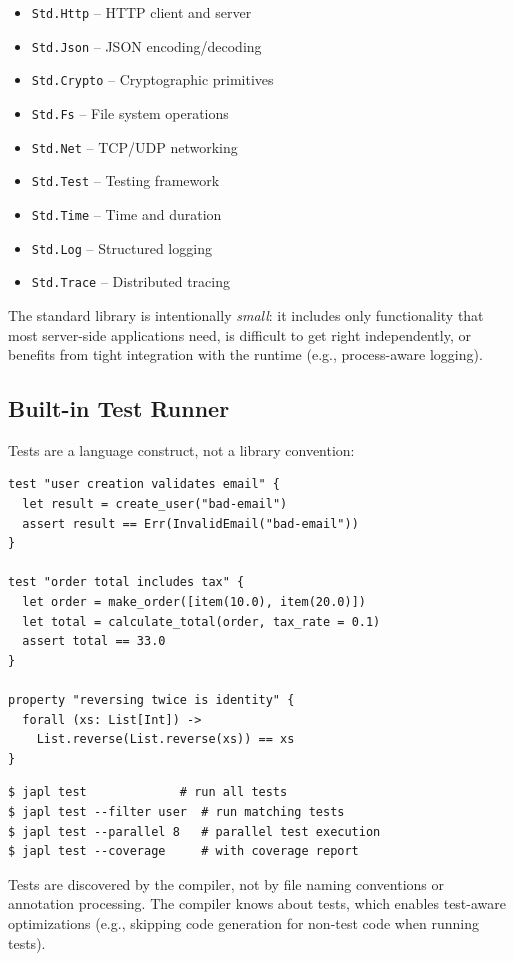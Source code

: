 \documentclass[11pt,twocolumn]{article}
\begin{document}
\begin{itemize}[leftmargin=*]
\item \texttt{Std.Http} -- HTTP client and server
\item \texttt{Std.Json} -- JSON encoding/decoding
\item \texttt{Std.Crypto} -- Cryptographic primitives
\item \texttt{Std.Fs} -- File system operations
\item \texttt{Std.Net} -- TCP/UDP networking
\item \texttt{Std.Test} -- Testing framework
\item \texttt{Std.Time} -- Time and duration
\item \texttt{Std.Log} -- Structured logging
\item \texttt{Std.Trace} -- Distributed tracing
\end{itemize}

The standard library is intentionally \emph{small}: it includes only functionality that most server-side applications need, is difficult to get right independently, or benefits from tight integration with the runtime (e.g., process-aware logging).

\subsection{Built-in Test Runner}

Tests are a language construct, not a library convention:

\begin{lstlisting}
test "user creation validates email" {
  let result = create_user("bad-email")
  assert result == Err(InvalidEmail("bad-email"))
}

test "order total includes tax" {
  let order = make_order([item(10.0), item(20.0)])
  let total = calculate_total(order, tax_rate = 0.1)
  assert total == 33.0
}

property "reversing twice is identity" {
  forall (xs: List[Int]) ->
    List.reverse(List.reverse(xs)) == xs
}
\end{lstlisting}

\begin{lstlisting}[language=shell]
$ japl test             # run all tests
$ japl test --filter user  # run matching tests
$ japl test --parallel 8   # parallel test execution
$ japl test --coverage     # with coverage report
\end{lstlisting}

Tests are discovered by the compiler, not by file naming conventions or annotation processing.
The compiler knows about tests, which enables test-aware optimizations (e.g., skipping code generation for non-test code when running tests).
\end{document}
